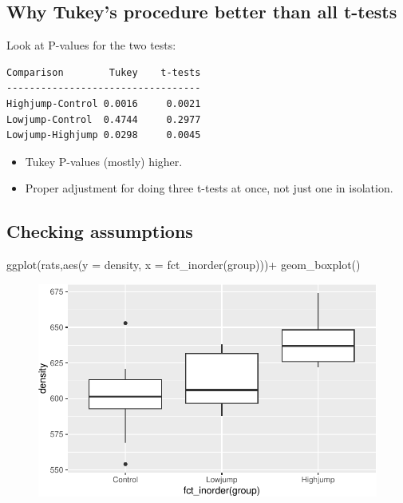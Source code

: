 \documentclass[
  letterpaper,
  DIV=11,
  numbers=noendperiod]{scrartcl}
\newenvironment{Shaded}{\begin{snugshade}}{\end{snugshade}}
\newcommand{\AttributeTok}[1]{\textcolor[rgb]{0.40,0.45,0.13}{#1}}
\newcommand{\FunctionTok}[1]{\textcolor[rgb]{0.28,0.35,0.67}{#1}}
\newcommand{\NormalTok}[1]{\textcolor[rgb]{0.00,0.23,0.31}{#1}}
\newcommand{\SpecialCharTok}[1]{\textcolor[rgb]{0.37,0.37,0.37}{#1}}
\providecommand{\tightlist}{%
  \setlength{\itemsep}{0pt}\setlength{\parskip}{0pt}}\usepackage{longtable,booktabs,array}
\begin{document}
\hypertarget{why-tukeys-procedure-better-than-all-t-tests}{%
\subsection{Why Tukey's procedure better than all
t-tests}\label{why-tukeys-procedure-better-than-all-t-tests}}

Look at P-values for the two tests:

\begin{verbatim}
Comparison        Tukey    t-tests
----------------------------------
Highjump-Control 0.0016     0.0021
Lowjump-Control  0.4744     0.2977
Lowjump-Highjump 0.0298     0.0045
\end{verbatim}

\begin{itemize}
\tightlist
\item
  Tukey P-values (mostly) higher.
\item
  Proper adjustment for doing three t-tests at once, not just one in
  isolation.
\end{itemize}

\hypertarget{checking-assumptions}{%
\subsection{Checking assumptions}\label{checking-assumptions}}

\begin{Shaded}
\begin{Highlighting}[]
\FunctionTok{ggplot}\NormalTok{(rats,}\FunctionTok{aes}\NormalTok{(}\AttributeTok{y =}\NormalTok{ density, }\AttributeTok{x =} \FunctionTok{fct\_inorder}\NormalTok{(group)))}\SpecialCharTok{+}
  \FunctionTok{geom\_boxplot}\NormalTok{()}
\end{Highlighting}
\end{Shaded}

\begin{figure}[H]

{\centering \includegraphics{inference_5_files/figure-pdf/inference-5-R-21-1.pdf}

}

\end{figure}
\end{document}
